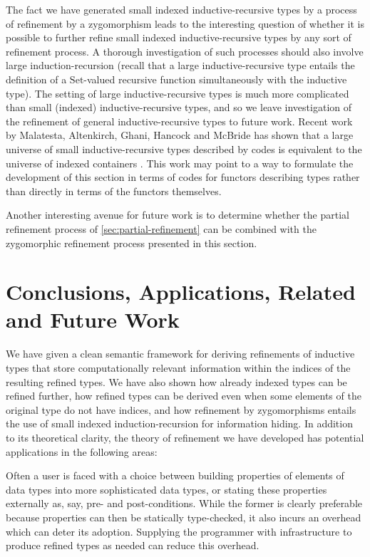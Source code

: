 \documentclass{LMCS}
\newcommand{\Set}{\mathrm{Set}}
\begin{document}
The fact we have generated small indexed inductive-recursive types by
a process of refinement by a zygomorphism leads to the interesting
question of whether it is possible to further refine small indexed
inductive-recursive types by any sort of refinement process. A
thorough investigation of such processes should also involve large
induction-recursion (recall that a large inductive-recursive type
entails the definition of a $\Set$-valued recursive function
simultaneously with the inductive type). The setting of large
inductive-recursive types is much more complicated than small
(indexed) inductive-recursive types, and so we leave investigation of
the refinement of general inductive-recursive types to future
work. Recent work by Malatesta, Altenkirch, Ghani, Hancock and McBride
\cite{malatesta12small} has shown that a large universe of small
inductive-recursive types described by codes is equivalent to the
universe of indexed containers \cite{alten09indexed}. This work may
point to a way to formulate the development of this section in terms
of codes for functors describing types rather than directly in terms
of the functors themselves.

Another interesting avenue for future work is to determine whether the
partial refinement process of \autoref{sec:partial-refinement} can be
combined with the zygomorphic refinement process presented in this
section.

\section{Conclusions, Applications, Related and Future Work}
\label{sec:discussion}

We have given a clean semantic framework for deriving refinements of
inductive types that store computationally relevant information within
the indices of the resulting refined types. We have also shown how
already indexed types can be refined further, how refined types can be
derived even when some elements of the original type do not have
indices, and how refinement by zygomorphisms entails the use of small
indexed induction-recursion for information hiding. In addition to its
theoretical clarity, the theory of refinement we have developed has
potential applications in the following areas:

\medskip

 Often a user is faced
with a choice between building properties of elements of data types
into more sophisticated data types, or stating these properties
externally as, say, pre- and post-conditions. While the former is
clearly preferable because properties can then be statically
type-checked, it also incurs an overhead which can deter its
adoption. Supplying the programmer with infrastructure to produce
refined types as needed can reduce this overhead.
\end{document}
